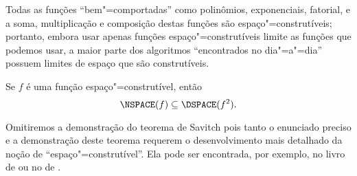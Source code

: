 Todas as funções ``bem"=comportadas'' como polinômios,
exponenciais, fatorial, e a soma, multiplicação e composição destas funções
são espaço"=construtíveis;
portanto,
embora usar apenas funções espaço"=construtíveis limite
as funções que podemos usar,
a maior parte dos algoritmos ``encontrados no dia"=a"=dia''
possuem limites de espaço que são construtíveis.

\begin{utheorem}
    Se $f$ é uma função espaço"=construtível, então
    \begin{equation*}
        \NSPACE(f) \subseteq \DSPACE(f^2).
    \end{equation*}
\end{utheorem}

Omitiremos a demonstração do teorema de Savitch
pois tanto o enunciado preciso e a demonstração deste teorema
requerem o desenvolvimento mais detalhado da noção de
``espaço"=construtível''.
Ela pode ser encontrada, por exemplo,
no livro de 
ou no de .

